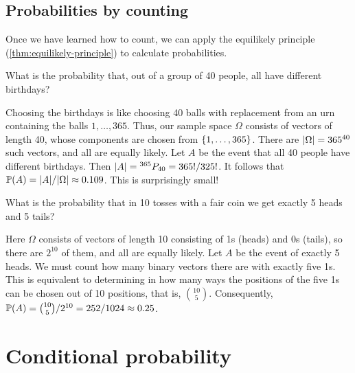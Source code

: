 \subsection{Probabilities by counting}\label{sec:probabilities-by-counting}

Once we have learned how to count, we can apply the equilikely principle (\cref{thm:equilikely-principle}) to calculate probabilities.

\begin{example}\label{ex:birthday-counting}
What is the probability that, out of a group of 40 people, all have different birthdays?
\end{example}

\begin{solution}
Choosing the birthdays is like choosing 40 balls with replacement from an urn containing the balls $1, \ldots, 365$. Thus, our sample space $\Omega$ consists of vectors of length 40, whose components are chosen from $\left\{ 1, \ldots, 365 \right\}$. There are $\lvert\Omega\rvert = 365^{40}$ such vectors, and all are equally likely. Let $A$ be the event that all 40 people have different birthdays. Then $\lvert A\rvert = {}^{365}P_{40} = 365!/325!$. It follows that $\mathbb{P}(A) = \lvert A\rvert/\lvert\Omega\rvert \approx 0.109$. This is surprisingly small!
\end{solution}

\begin{example}\label{ex:five-heads}
What is the probability that in 10 tosses with a fair coin we get exactly 5 heads and 5 tails?
\end{example}

\begin{solution}
Here $\Omega$ consists of vectors of length 10 consisting of 1s (heads) and 0s (tails), so there are $2^{10}$ of them, and all are equally likely. Let $A$ be the event of exactly 5 heads. We must count how many binary vectors there are with exactly five 1s. This is equivalent to determining in how many ways the positions of the five 1s can be chosen out of 10 positions, that is, $\binom{10}{5}$. Consequently, $\mathbb{P}(A) = \binom{10}{5}/2^{10} = 252/1024 \approx 0.25$.
\end{solution}

\section{Conditional probability}\label{sec:conditional-probability}

